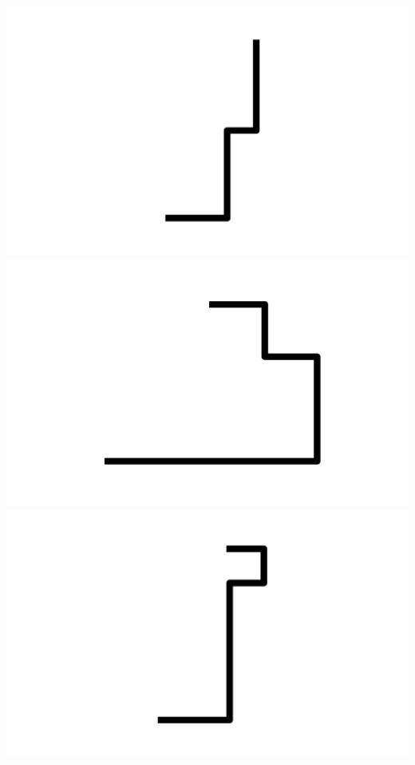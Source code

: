 \documentclass[]{report}
\begin{document}
\includegraphics[scale=.1]{pictures/21/state_cluster_shapes_478.pdf} 
\includegraphics[scale=.1]{pictures/21/state_cluster_shapes_479.pdf} 
\includegraphics[scale=.1]{pictures/21/state_cluster_shapes_480.pdf} 
\end{document}
